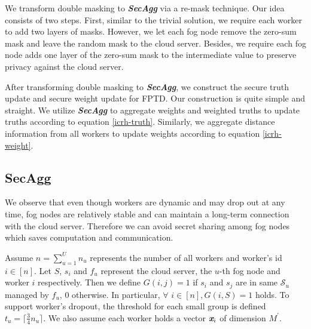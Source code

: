 \documentclass[conference,a4paper]{IEEEtran}
\def\textbi#1{\textbf{\em #1}}
\begin{document}
    We transform double masking to \textbi{SecAgg} via a re-mask technique. Our idea consists of two steps. First, similar to the trivial solution, we require each worker to add two layers of masks. However, we let each fog node remove the zero-sum mask and leave the random mask to the cloud server. Besides, we require each fog node adds one layer of the zero-sum mask to the intermediate value to preserve privacy against the cloud server.

    After transforming double masking to \textbi{SecAgg}, we construct the secure truth update and secure weight update for FPTD. Our construction is quite simple and straight. We utilize \textbi{SecAgg} to aggregate weights and weighted truths to update truths according to equation \ref{icrh-truth}. Similarly, we aggregate distance information from all workers to update weights according to equation \ref{icrh-weight}.

    \subsection{\textbf{SecAgg}}\label{sec_sum}
    We observe that even though workers are dynamic and may drop out at any time, fog nodes are relatively stable and can maintain a long-term connection with the cloud server. Therefore we can avoid secret sharing among fog nodes which saves computation and communication.

    Assume $n=\sum_{u=1}^U n_u$ represents the number of all workers and worker's id $i\in [n]$. Let $S$, $s_i$ and $f_u$ represent the cloud server, the $u$-th fog node and worker $i$ respectively. Then we define $G(i,j)=1$ if $s_i$ and $s_j$ are in same $\mathcal{S}_u$ managed by $f_u$, 0 otherwise. In particular, $\forall$ $i\in [n], G(i,S)=1$ holds. To support worker's dropout, the threshold for each small group is defined $t_u=\lceil \frac{3}{4} n_u\rceil$. We also assume each worker holds a vector $\textbi{x}_i$ of dimension $M^\prime$.\\
\end{document}

